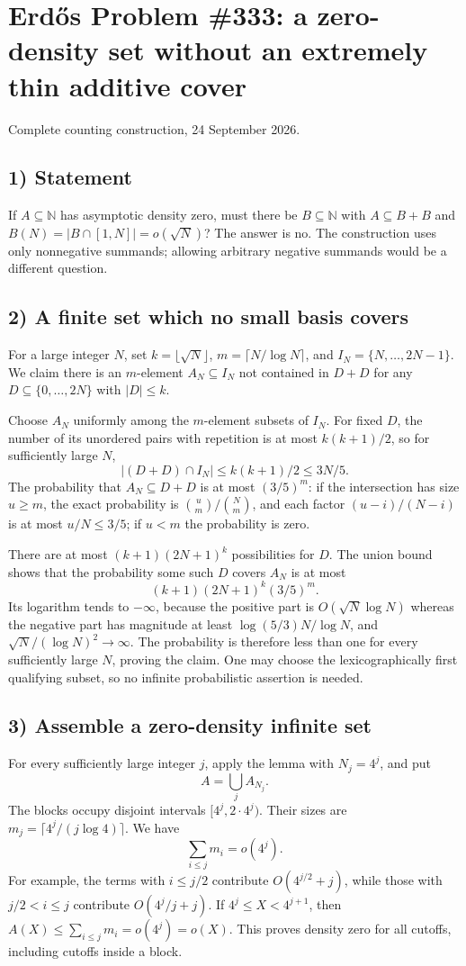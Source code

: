 \section{Erd\H{o}s Problem \#333: a zero-density set without an extremely thin additive cover}
\noindent Complete counting construction, 24 September 2026.

\subsection*{1) Statement}
If $A\subseteq\mathbb N$ has asymptotic density zero, must there be $B\subseteq\mathbb N$ with $A\subseteq B+B$ and $B(N)=|B\cap[1,N]|=o(\sqrt N)$? The answer is no. The construction uses only nonnegative summands; allowing arbitrary negative summands would be a different question.

\subsection*{2) A finite set which no small basis covers}
For a large integer $N$, set $k=\lfloor\sqrt N\rfloor$, $m=\lceil N/\log N\rceil$, and $I_N=\{N,\ldots,2N-1\}$. We claim there is an $m$-element $A_N\subseteq I_N$ not contained in $D+D$ for any $D\subseteq\{0,\ldots,2N\}$ with $|D|\le k$.

Choose $A_N$ uniformly among the $m$-element subsets of $I_N$. For fixed $D$, the number of its unordered pairs with repetition is at most $k(k+1)/2$, so for sufficiently large $N$,
\[|(D+D)\cap I_N|\le k(k+1)/2\le3N/5.
\]
The probability that $A_N\subseteq D+D$ is at most $(3/5)^m$: if the intersection has size $u\ge m$, the exact probability is $\binom um/\binom Nm$, and each factor $(u-i)/(N-i)$ is at most $u/N\le3/5$; if $u<m$ the probability is zero.

There are at most $(k+1)(2N+1)^k$ possibilities for $D$. The union bound shows that the probability some such $D$ covers $A_N$ is at most
\[(k+1)(2N+1)^k(3/5)^m.
\]
Its logarithm tends to $-\infty$, because the positive part is $O(\sqrt N\log N)$ whereas the negative part has magnitude at least $\log(5/3)N/\log N$, and $\sqrt N/(\log N)^2\to\infty$. The probability is therefore less than one for every sufficiently large $N$, proving the claim. One may choose the lexicographically first qualifying subset, so no infinite probabilistic assertion is needed.

\subsection*{3) Assemble a zero-density infinite set}
For every sufficiently large integer $j$, apply the lemma with $N_j=4^j$, and put
\[A=\bigcup_j A_{N_j}.
\]
The blocks occupy disjoint intervals $[4^j,2\cdot4^j)$. Their sizes are $m_j=\lceil4^j/(j\log4)\rceil$. We have
\[\sum_{i\le j}m_i=o(4^j).
\tag{1}\]
For example, the terms with $i\le j/2$ contribute $O(4^{j/2}+j)$, while those with $j/2<i\le j$ contribute $O(4^j/j+j)$. If $4^j\le X<4^{j+1}$, then $A(X)\le\sum_{i\le j}m_i=o(4^j)=o(X)$. This proves density zero for all cutoffs, including cutoffs inside a block.

